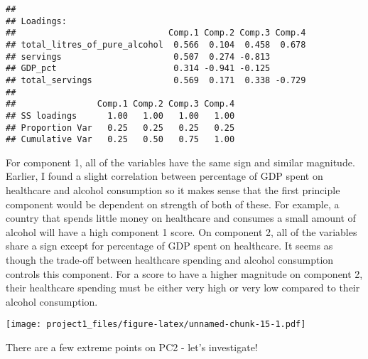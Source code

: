 \documentclass[]{article}
\newenvironment{Shaded}{\begin{snugshade}}{\end{snugshade}}
\newcommand{\KeywordTok}[1]{\textcolor[rgb]{0.13,0.29,0.53}{\textbf{#1}}}
\newcommand{\DecValTok}[1]{\textcolor[rgb]{0.00,0.00,0.81}{#1}}
\newcommand{\StringTok}[1]{\textcolor[rgb]{0.31,0.60,0.02}{#1}}
\newcommand{\OperatorTok}[1]{\textcolor[rgb]{0.81,0.36,0.00}{\textbf{#1}}}
\newcommand{\NormalTok}[1]{#1}
\begin{document}
\begin{verbatim}
## 
## Loadings:
##                              Comp.1 Comp.2 Comp.3 Comp.4
## total_litres_of_pure_alcohol  0.566  0.104  0.458  0.678
## servings                      0.507  0.274 -0.813       
## GDP_pct                       0.314 -0.941 -0.125       
## total_servings                0.569  0.171  0.338 -0.729
## 
##                Comp.1 Comp.2 Comp.3 Comp.4
## SS loadings      1.00   1.00   1.00   1.00
## Proportion Var   0.25   0.25   0.25   0.25
## Cumulative Var   0.25   0.50   0.75   1.00
\end{verbatim}

For component 1, all of the variables have the same sign and similar
magnitude. Earlier, I found a slight correlation between percentage of
GDP spent on healthcare and alcohol consumption so it makes sense that
the first principle component would be dependent on strength of both of
these. For example, a country that spends little money on healthcare and
consumes a small amount of alcohol will have a high component 1 score.
On component 2, all of the variables share a sign except for percentage
of GDP spent on healthcare. It seems as though the trade-off between
healthcare spending and alcohol consumption controls this component. For
a score to have a higher magnitude on component 2, their healthcare
spending must be either very high or very low compared to their alcohol
consumption.

\begin{Shaded}
\end{Shaded}

\texttt{[image: project1\_files/figure-latex/unnamed-chunk-15-1.pdf]}

There are a few extreme points on PC2 - let's investigate!

\begin{Shaded}
\end{Shaded}
\end{document}
